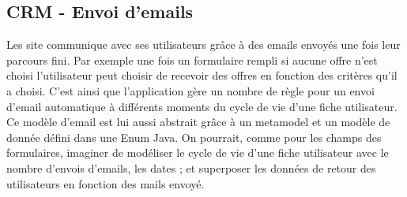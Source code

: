 \subsection{CRM - Envoi d'emails}
Les site communique avec ses utilisateurs grâce à des emails envoyés une fois leur parcours fini. Par exemple une fois un formulaire rempli si aucune offre n'est choisi l'utilisateur peut choisir de recevoir des offres en fonction des critères qu'il a choisi. C'est ainsi que l'application gère un nombre de règle pour un envoi d'email automatique à différents moments du cycle de vie d'une fiche utilisateur.
Ce modèle d'email est lui aussi abstrait grâce à un metamodel et un modèle de donnée défini dans une Enum Java. On pourrait, comme pour les champs des formulaires, imaginer de modéliser le cycle de vie d'une fiche utilisateur avec le nombre d'envois d'emails, les dates ; et superposer les données de retour des utilisateurs en fonction des mails envoyé.